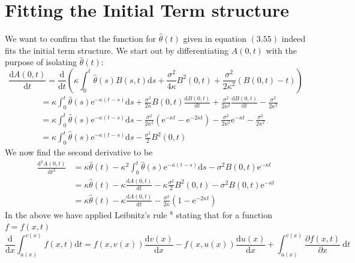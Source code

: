 \documentclass[12pt,twoside]{reedthesis}
\begin{document}
\hypertarget{fitting-the-initial-term-structure}{%
\section{Fitting the Initial Term structure}\label{fitting-the-initial-term-structure}}

We want to confirm that the function for \(\hat{\theta}(t)\) given in equation \((3.55)\) indeed fits the initial term structure. We start out by differentiating \(A(0, t)\) with the purpose of isolating \(\hat{\theta}(t):\)
\[
\frac{\mathrm{d} A(0, t)}{\mathrm{d} t}=\frac{\mathrm{d}}{\mathrm{d} t}\left(\kappa \int_{0}^{t} \hat{\theta}(s) B(s, t) \mathrm{d} s+\frac{\sigma^{2}}{4 \kappa} B^{2}(0, t)+\frac{\sigma^{2}}{2 \kappa^{2}}(B(0, t)-t)\right)
\]
\[
\begin{aligned}
&=\kappa \int_{0}^{t} \hat{\theta}(s) \mathrm{e}^{-\kappa(t-s)} \mathrm{d} s+\frac{\sigma^{2}}{2 \kappa} B(0, t) \frac{\mathrm{d} B(0, t)}{\mathrm{d} t}+\frac{\sigma^{2}}{2 \kappa^{2}} \frac{\mathrm{d} B(0, t)}{\mathrm{d} t}-\frac{\sigma^{2}}{2 \kappa^{2}} \\
&=\kappa \int_{0}^{t} \hat{\theta}(s) \mathrm{e}^{-\kappa(t-s)} \mathrm{d} s-\frac{\sigma^{2}}{2 \kappa^{2}}\left(\mathrm{e}^{-\kappa t}-\mathrm{e}^{-2 \kappa t}\right)-\frac{\sigma^{2}}{2 \kappa^{2}} \mathrm{e}^{-\kappa t}-\frac{\sigma^{2}}{2 \kappa^{2}} \\
&=\kappa \int_{0}^{t} \hat{\theta}(s) \mathrm{e}^{-\kappa(t-s)} \mathrm{d} s-\frac{\sigma^{2}}{2} B^{2}(0, t)
\end{aligned}
\]
We now find the second derivative to be
\[
\begin{aligned}
\frac{\mathrm{d}^{2} A(0, t)}{\mathrm{d} t^{2}} &=\kappa \hat{\theta}(t)-\kappa^{2} \int_{0}^{t} \hat{\theta}(s) \mathrm{e}^{-\kappa(t-s)} \mathrm{d} s-\sigma^{2} B(0, t) \mathrm{e}^{-\kappa t} \\
&=\kappa \hat{\theta}(t)-\kappa \frac{\mathrm{d} A(0, t)}{\mathrm{d} t}-\kappa \frac{\sigma^{2}}{2} B^{2}(0, t)-\sigma^{2} B(0, t) \mathrm{e}^{-\kappa t} \\
&=\kappa \hat{\theta}(t)-\kappa \frac{\mathrm{d} A(0, t)}{\mathrm{d} t}-\frac{\sigma^{2}}{2 \kappa}\left(1-\mathrm{e}^{-2 \kappa t}\right)
\end{aligned}
\]
In the above we have applied Leibnitz's rule \({ }^{8}\) stating that for a function \(f=f(x, t)\)
\[
\frac{\mathrm{d}}{\mathrm{d} x} \int_{u(x)}^{v(x)} f(x, t) \mathrm{d} t=f(x, v(x)) \frac{\mathrm{d} v(x)}{\mathrm{d} x}-f(x, u(x)) \frac{\mathrm{d} u(x)}{\mathrm{d} x}+\int_{u(x)}^{v(x)} \frac{\partial f(x, t)}{\partial x} \mathrm{~d} t
\]
\end{document}
